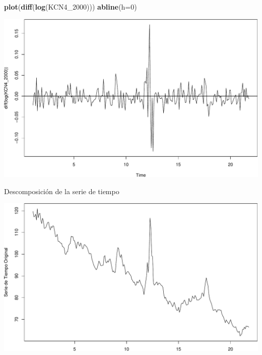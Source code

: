 \documentclass[
  10pt,
  ignorenonframetext,
  aspectratio=1612]{beamer}
\newenvironment{Shaded}{\begin{snugshade}}{\end{snugshade}}
\newcommand{\AttributeTok}[1]{\textcolor[rgb]{0.13,0.29,0.53}{#1}}
\newcommand{\DecValTok}[1]{\textcolor[rgb]{0.00,0.00,0.81}{#1}}
\newcommand{\FunctionTok}[1]{\textcolor[rgb]{0.13,0.29,0.53}{\textbf{#1}}}
\newcommand{\NormalTok}[1]{#1}
\newcommand{\OtherTok}[1]{\textcolor[rgb]{0.56,0.35,0.01}{#1}}
\newcommand{\SpecialCharTok}[1]{\textcolor[rgb]{0.81,0.36,0.00}{\textbf{#1}}}
\newcommand{\StringTok}[1]{\textcolor[rgb]{0.31,0.60,0.02}{#1}}
\begin{document}
\begin{frame}[fragile]{}
\label{section-1}
\begin{Shaded}
\begin{Highlighting}[]
\FunctionTok{plot}\NormalTok{(}\FunctionTok{diff}\NormalTok{(}\FunctionTok{log}\NormalTok{(KCN4\_2000))) }
\FunctionTok{abline}\NormalTok{(}\AttributeTok{h=}\DecValTok{0}\NormalTok{)}
\end{Highlighting}
\end{Shaded}

\includegraphics{Informe_files/figure-beamer/unnamed-chunk-6-1.pdf}
\end{frame}

\begin{frame}[fragile]{Descomposición de la serie de tiempo}
\label{descomposiciuxf3n-de-la-serie-de-tiempo}
\begin{Shaded}
\end{Shaded}

\includegraphics{Informe_files/figure-beamer/unnamed-chunk-7-1.pdf}
\end{frame}
\end{document}
